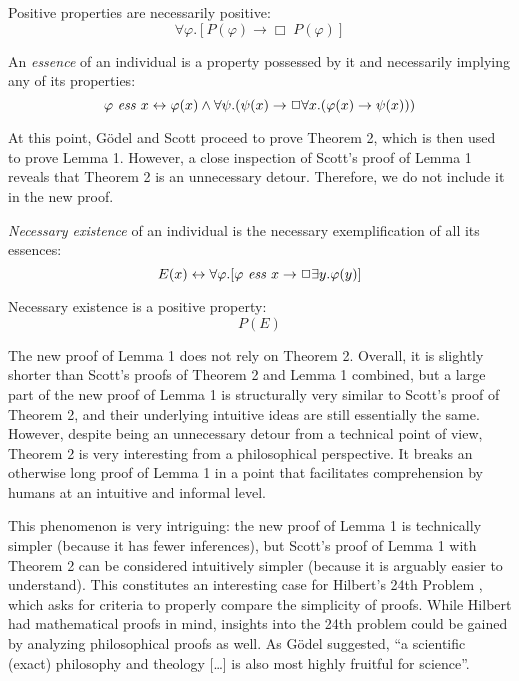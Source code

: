 \documentclass[smallextended]{svjour3}
\newcommand{\imp}{\rightarrow}
\newcommand{\biimp}{\leftrightarrow}
\newcommand{\all}{\forall}
\newcommand{\ex}{\exists}
\newcommand{\nec}{\Box} %
\begin{document}
\begin{axiom}
\label{N:A4}
Positive properties are necessarily positive:
$$
\all \varphi.[P(\varphi) \to \Box \; P(\varphi)]
$$
\end{axiom}

\begin{definition}
\label{N:D2}
An \emph{essence} of an individual is a property possessed by it and necessarily implying any of its properties:
$$
\ess{\varphi}{x} \biimp \varphi(x) \wedge \all \psi. (\psi(x) \imp \nec \all x. (\varphi(x) \imp \psi(x)))
$$
\end{definition}


At this point, G\"odel and Scott proceed to prove Theorem 2, which is then used to prove Lemma 1. However, a close inspection of Scott's proof of Lemma 1 reveals that Theorem 2 is an unnecessary detour. Therefore, we do not include it in the new proof.


\begin{definition}
\label{N:D3}
\emph{Necessary existence} of an individual is the necessary exemplification of all its essences:
$$
E(x) \biimp \all \varphi.[\ess{\varphi}{x} \imp \nec \ex y.\varphi(y)]
$$
\end{definition}


\begin{axiom}
\label{N:A5}
Necessary existence is a positive property:
$$
P(E)
$$
\end{axiom}


The new proof of Lemma 1 does not rely on Theorem 2. Overall, it is slightly shorter than Scott's proofs of Theorem 2 and Lemma 1 combined, but a large part of the new proof of Lemma 1 is structurally very similar to Scott's proof of Theorem 2, and their underlying intuitive ideas are still essentially the same. However, despite being an unnecessary detour from a technical point of view, Theorem 2 is very interesting from a philosophical perspective. It breaks an otherwise long proof of Lemma 1 in a point that facilitates comprehension by humans at an intuitive and informal level.

This phenomenon is very intriguing: the new proof of Lemma 1 is technically simpler (because it has fewer inferences), but Scott's proof of Lemma 1 with Theorem 2 can be considered intuitively simpler (because it is arguably easier to understand). This constitutes an interesting case for Hilbert's 24th Problem \citep{hilbert}, which asks for criteria to properly compare the simplicity of proofs. While Hilbert had mathematical proofs in mind, insights into the 24th problem could be gained by analyzing philosophical proofs as well. As G\"odel suggested, ``a scientific (exact) philosophy and theology [\ldots] is also most highly fruitful for science''.
\end{document}
